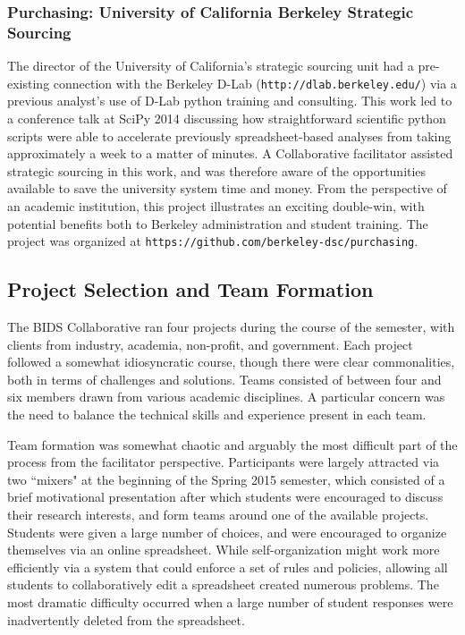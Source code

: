 \documentclass[12pt]{article}
\begin{document}
\subsubsection*{Purchasing: University of California Berkeley Strategic Sourcing}

The director of the University of California's strategic sourcing unit had a pre-existing connection with the Berkeley D-Lab (\texttt{http://dlab.berkeley.edu/}) via a previous analyst's use of D-Lab python training and consulting. This work led to a conference talk at SciPy 2014 discussing how straightforward scientific python scripts were able to accelerate previously spreadsheet-based analyses from taking approximately a week to a matter of minutes. A Collaborative facilitator assisted strategic sourcing in this work, and was therefore aware of the opportunities available to save the university system time and money. From the perspective of an academic institution, this project illustrates an exciting double-win, with potential benefits both to Berkeley administration and student training.  The project was organized at \texttt{https://github.com/berkeley-dsc/purchasing}.

\subsection{Project Selection and Team Formation}

The BIDS Collaborative ran four projects during the course of the semester, with clients from industry, academia, non-profit, and government. Each project followed a somewhat idiosyncratic course, though there were clear commonalities, both in terms of challenges and solutions. Teams consisted of between four and six members drawn from various academic disciplines. A particular concern was the need to balance the technical skills and experience present in each team.

Team formation was somewhat chaotic and arguably the most difficult part of the process from the facilitator perspective. Participants were largely attracted via two ``mixers" at the beginning of the Spring 2015 semester, which consisted of a brief motivational presentation after which students were encouraged to discuss their research interests, and form teams around one of the available projects. Students were given a large number of choices, and were encouraged to organize themselves via an online spreadsheet. While self-organization might work more efficiently via a system that could enforce a set of rules and policies, allowing all students to collaboratively edit a spreadsheet created numerous problems. The most dramatic difficulty occurred when a large number of student responses were inadvertently deleted from the spreadsheet.
\end{document}
